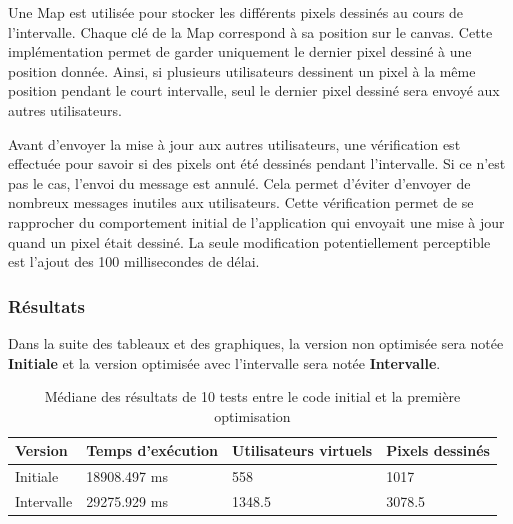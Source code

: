 Une Map est utilisée pour stocker les différents pixels dessinés au cours de l'intervalle. Chaque clé de la Map correspond à sa position sur le canvas. Cette implémentation permet de garder uniquement le dernier pixel dessiné à une position donnée. Ainsi, si plusieurs utilisateurs dessinent un pixel à la même position pendant le court intervalle, seul le dernier pixel dessiné sera envoyé aux autres utilisateurs.

Avant d'envoyer la mise à jour aux autres utilisateurs, une vérification est effectuée pour savoir si des pixels ont été dessinés pendant l'intervalle. Si ce n'est pas le cas, l'envoi du message est annulé. Cela permet d'éviter d'envoyer de nombreux messages inutiles aux utilisateurs. Cette vérification permet de se rapprocher du comportement initial de l'application qui envoyait une mise à jour quand un pixel était dessiné. La seule modification potentiellement perceptible est l'ajout des 100 millisecondes de délai.

\subsubsection{Résultats}

Dans la suite des tableaux et des graphiques, la version non optimisée sera notée \textbf{Initiale} et la version optimisée avec l'intervalle sera notée \textbf{Intervalle}.







\begin{table}[H]
  \centering
  \begin{tabular}{|l|l|l|l|}
    \hline
    \textbf{Version} & \textbf{Temps d'exécution} & \textbf{Utilisateurs virtuels} & \textbf{Pixels dessinés} \\ \hline
    Initiale         & 18908.497 ms               & 558                            & 1017                     \\ \hline
    Intervalle       & 29275.929 ms               & 1348.5                         & 3078.5                   \\ \hline
  \end{tabular}
  \caption{Médiane des résultats de 10 tests entre le code initial et la première optimisation}
  \label{table:first-opti-results}
\end{table}

